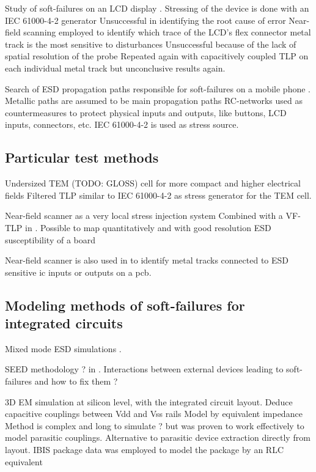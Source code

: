 Study of soft-failures on an LCD display \cite{softFailLCD}.
Stressing of the device is done with an IEC 61000-4-2 generator
Unsuccessful in identifying the root cause of error
Near-field scanning employed to identify which trace of the LCD's flex connector metal track is the most sensitive to disturbances
Unsuccessful because of the lack of spatial resolution of the probe
Repeated again with capacitively coupled TLP on each individual metal track but unconclusive results again.

Search of ESD propagation paths responsible for soft-failures on a mobile phone \cite{softFailMobile}.
Metallic paths are assumed to be main propagation paths
RC-networks used as countermeasures to protect physical inputs and outputs, like buttons, LCD inputs, connectors, etc.
IEC 61000-4-2 is used as stress source.

\subsection{Particular test methods}

%
Undersized TEM (TODO: GLOSS) cell for more compact and higher electrical fields \cite{SDRAMCase}
Filtered TLP similar to IEC 61000-4-2 \cite{iec61000-4-2} as stress generator for the TEM cell.

%
Near-field scanner as a very local stress injection system
Combined with a VF-TLP in \cite{NearFieldInjectionFabrice}.
Possible to map quantitatively and with good resolution ESD susceptibility of a board

%
Near-field scanner is also used in \cite{NearFieldInjectionBis} to identify metal tracks connected to ESD sensitive \gls{ic} inputs or outputs on a \gls{pcb}.


\subsection{Modeling methods of soft-failures for integrated circuits}

%
Mixed mode ESD simulations \cite{mixedModeESDSims}.

%
SEED methodology ? in \cite{usb2ESDProtection}.
Interactions between external devices leading to soft-failures and how to fix them ?

3D EM simulation \cite{LacrampeTransientImmunity} at silicon level, with the integrated circuit layout.
Deduce capacitive couplings between Vdd and Vss rails
Model by equivalent impedance
Method is complex and long to simulate ? but was proven to work effectively to model parasitic couplings.
Alternative to parasitic device extraction directly from layout.
IBIS package data was employed to model the package by an RLC equivalent


